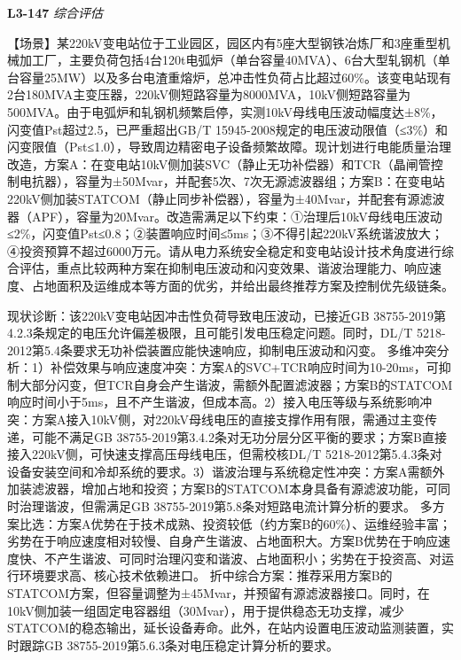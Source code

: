 \documentclass[12pt,a4paper]{ctexart}
\begin{document}
\noindent\textbf{L3-147} \hfill \textit{综合评估}
\begin{description}[leftmargin=1.5em,style=nextline,font=\normalfont]
  \item[Q:] 【场景】某220kV变电站位于工业园区，园区内有5座大型钢铁冶炼厂和3座重型机械加工厂，主要负荷包括4台120t电弧炉（单台容量40MVA）、6台大型轧钢机（单台容量25MW）以及多台电渣重熔炉，总冲击性负荷占比超过60\%。该变电站现有2台180MVA主变压器，220kV侧短路容量为8000MVA，10kV侧短路容量为500MVA。由于电弧炉和轧钢机频繁启停，实测10kV母线电压波动幅度达±8\%，闪变值Pst超过2.5，已严重超出GB/T 15945-2008规定的电压波动限值（≤3\%）和闪变限值（Pst≤1.0），导致周边精密电子设备频繁故障。现计划进行电能质量治理改造，方案A：在变电站10kV侧加装SVC（静止无功补偿器）和TCR（晶闸管控制电抗器），容量为±50Mvar，并配套5次、7次无源滤波器组；方案B：在变电站220kV侧加装STATCOM（静止同步补偿器），容量为±40Mvar，并配套有源滤波器（APF），容量为20Mvar。改造需满足以下约束：①治理后10kV母线电压波动≤2\%，闪变值Pst≤0.8；②装置响应时间≤5ms；③不得引起220kV系统谐波放大；④投资预算不超过6000万元。请从电力系统安全稳定和变电站设计技术角度进行综合评估，重点比较两种方案在抑制电压波动和闪变效果、谐波治理能力、响应速度、占地面积及运维成本等方面的优劣，并给出最终推荐方案及控制优先级链条。
  \item[A:] 现状诊断：该220kV变电站因冲击性负荷导致电压波动，已接近GB 38755-2019第4.2.3条规定的电压允许偏差极限，且可能引发电压稳定问题。同时，DL/T 5218-2012第5.4条要求无功补偿装置应能快速响应，抑制电压波动和闪变。
多维冲突分析：1）补偿效果与响应速度冲突：方案A的SVC+TCR响应时间为10-20ms，可抑制大部分闪变，但TCR自身会产生谐波，需额外配置滤波器；方案B的STATCOM响应时间小于5ms，且不产生谐波，但成本高。2）接入电压等级与系统影响冲突：方案A接入10kV侧，对220kV母线电压的直接支撑作用有限，需通过主变传递，可能不满足GB 38755-2019第3.4.2条对无功分层分区平衡的要求；方案B直接接入220kV侧，可快速支撑高压母线电压，但需校核DL/T 5218-2012第5.4.3条对设备安装空间和冷却系统的要求。3）谐波治理与系统稳定性冲突：方案A需额外加装滤波器，增加占地和投资；方案B的STATCOM本身具备有源滤波功能，可同时治理谐波，但需满足GB 38755-2019第5.8条对短路电流计算分析的要求。
多方案比选：方案A优势在于技术成熟、投资较低（约方案B的60\%）、运维经验丰富；劣势在于响应速度相对较慢、自身产生谐波、占地面积大。方案B优势在于响应速度快、不产生谐波、可同时治理闪变和谐波、占地面积小；劣势在于投资高、对运行环境要求高、核心技术依赖进口。
折中综合方案：推荐采用方案B的STATCOM方案，但容量调整为±45Mvar，并预留有源滤波器接口。同时，在10kV侧加装一组固定电容器组（30Mvar），用于提供稳态无功支撑，减少STATCOM的稳态输出，延长设备寿命。此外，在站内设置电压波动监测装置，实时跟踪GB 38755-2019第5.6.3条对电压稳定计算分析的要求。

\end{description}
\end{document}

